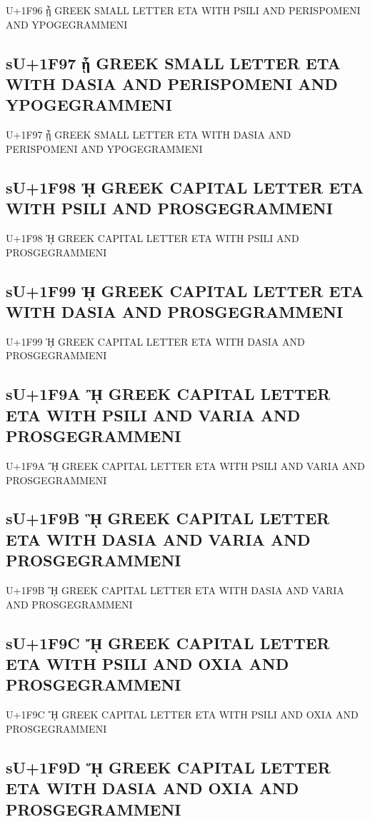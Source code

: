 U+1F96 ᾖ GREEK SMALL LETTER ETA WITH PSILI AND PERISPOMENI AND YPOGEGRAMMENI

\subsection{sU+1F97 ᾗ GREEK SMALL LETTER ETA WITH DASIA AND PERISPOMENI AND YPOGEGRAMMENI}

U+1F97 ᾗ GREEK SMALL LETTER ETA WITH DASIA AND PERISPOMENI AND YPOGEGRAMMENI

\subsection{sU+1F98 ᾘ GREEK CAPITAL LETTER ETA WITH PSILI AND PROSGEGRAMMENI}

U+1F98 ᾘ GREEK CAPITAL LETTER ETA WITH PSILI AND PROSGEGRAMMENI

\subsection{sU+1F99 ᾙ GREEK CAPITAL LETTER ETA WITH DASIA AND PROSGEGRAMMENI}

U+1F99 ᾙ GREEK CAPITAL LETTER ETA WITH DASIA AND PROSGEGRAMMENI

\subsection{sU+1F9A ᾚ GREEK CAPITAL LETTER ETA WITH PSILI AND VARIA AND PROSGEGRAMMENI}

U+1F9A ᾚ GREEK CAPITAL LETTER ETA WITH PSILI AND VARIA AND PROSGEGRAMMENI

\subsection{sU+1F9B ᾛ GREEK CAPITAL LETTER ETA WITH DASIA AND VARIA AND PROSGEGRAMMENI}

U+1F9B ᾛ GREEK CAPITAL LETTER ETA WITH DASIA AND VARIA AND PROSGEGRAMMENI

\subsection{sU+1F9C ᾜ GREEK CAPITAL LETTER ETA WITH PSILI AND OXIA AND PROSGEGRAMMENI}

U+1F9C ᾜ GREEK CAPITAL LETTER ETA WITH PSILI AND OXIA AND PROSGEGRAMMENI

\subsection{sU+1F9D ᾝ GREEK CAPITAL LETTER ETA WITH DASIA AND OXIA AND PROSGEGRAMMENI}

